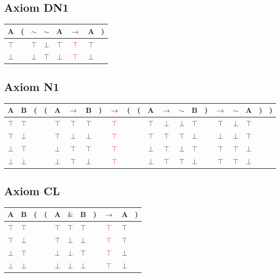 \documentclass{article}
\begin{document}
\subsection{Axiom DN1}
\begin{tabular}{@{ }c | c@{}@{ }c@{ }@{ }c@{ }@{ }c@{ }@{ }c@{ }@{ }c@{ }@{}c@{ }}
A & ( & $\sim$ & $\sim$ & A & $\rightarrow$ & A & )\\
\hline 
$\top$ &  & $\top$ & $\bot$ & $\top$ & \textcolor{red}{$\top$} & $\top$ & \\
$\bot$ &  & $\bot$ & $\top$ & $\bot$ & \textcolor{red}{$\top$} & $\bot$ & \\
\end{tabular}

\subsection{Axiom N1}
\begin{tabular}{@{ }c@{ }@{ }c | c@{}@{}c@{}@{ }c@{ }@{ }c@{ }@{ }c@{ }@{}c@{}@{ }c@{ }@{}c@{}@{}c@{}@{ }c@{ }@{ }c@{ }@{ }c@{ }@{ }c@{ }@{}c@{}@{ }c@{ }@{ }c@{ }@{ }c@{ }@{}c@{}@{}c@{ }}
A & B & ( & ( & A & $\rightarrow$ & B & ) & $\rightarrow$ & ( & ( & A & $\rightarrow$ & $\sim$ & B & ) & $\rightarrow$ & $\sim$ & A & ) & )\\
\hline 
$\top$ & $\top$ &  &  & $\top$ & $\top$ & $\top$ &  & \textcolor{red}{$\top$} &  &  & $\top$ & $\bot$ & $\bot$ & $\top$ &  & $\top$ & $\bot$ & $\top$ &  & \\
$\top$ & $\bot$ &  &  & $\top$ & $\bot$ & $\bot$ &  & \textcolor{red}{$\top$} &  &  & $\top$ & $\top$ & $\top$ & $\bot$ &  & $\bot$ & $\bot$ & $\top$ &  & \\
$\bot$ & $\top$ &  &  & $\bot$ & $\top$ & $\top$ &  & \textcolor{red}{$\top$} &  &  & $\bot$ & $\top$ & $\bot$ & $\top$ &  & $\top$ & $\top$ & $\bot$ &  & \\
$\bot$ & $\bot$ &  &  & $\bot$ & $\top$ & $\bot$ &  & \textcolor{red}{$\top$} &  &  & $\bot$ & $\top$ & $\top$ & $\bot$ &  & $\top$ & $\top$ & $\bot$ &  & \\
\end{tabular}
\subsection{Axiom CL}
\begin{tabular}{@{ }c@{ }@{ }c | c@{}@{}c@{}@{ }c@{ }@{ }c@{ }@{ }c@{ }@{}c@{}@{ }c@{ }@{ }c@{ }@{}c@{ }}
A & B & ( & ( & A & $\&$ & B & ) & $\rightarrow$ & A & )\\
\hline 
$\top$ & $\top$ &  &  & $\top$ & $\top$ & $\top$ &  & \textcolor{red}{$\top$} & $\top$ & \\
$\top$ & $\bot$ &  &  & $\top$ & $\bot$ & $\bot$ &  & \textcolor{red}{$\top$} & $\top$ & \\
$\bot$ & $\top$ &  &  & $\bot$ & $\bot$ & $\top$ &  & \textcolor{red}{$\top$} & $\bot$ & \\
$\bot$ & $\bot$ &  &  & $\bot$ & $\bot$ & $\bot$ &  & \textcolor{red}{$\top$} & $\bot$ & \\
\end{tabular}
\end{document}
